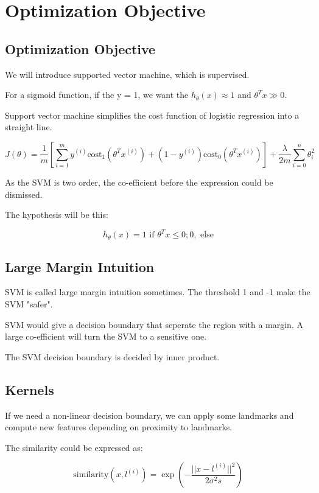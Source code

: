 \documentclass[en,11pt,english,black,simple]{../elegantbook}
\begin{document}
\fi 
\def\chapname{07optimibj}

\chapter{Optimization Objective}

\section{Optimization Objective}

We will introduce supported vector machine, which is supervised. 

For a sigmoid function, if the y = 1, we want the \(h_\theta(x)\approx 1\) and \(\theta^T x \gg 0\). 

Support vector machine simplifies the cost function of logistic regression into a straight line. 

\[J(\theta) = \frac{1}{m}\left[\sum_{i = 1}^{m} y^{(i)} \text{cost}_1 (\theta^T x^{(i)}) + (1 - y^{(i)}) \text{cost}_0 (\theta^T x^{(i)})\right] + \frac{\lambda}{2 m} \sum_{i = 0}^n \theta_i^2\]

As the SVM is two order, the co-efficient before the expression could be dismissed. 

The hypothesis will be this: 

\[h_\theta(x) = 1 \text{ if } \theta^T x \leq 0; 0, \text{ else}\]

\section{Large Margin Intuition}

SVM is called large margin intuition sometimes. The threshold 1 and -1 make the SVM "safer". 

SVM would give a decision boundary that seperate the region with a margin. A large co-efficient will turn the SVM to a sensitive one.

The SVM decision boundary is decided by inner product.

\section{Kernels}

If we need a non-linear decision boundary, we can apply some landmarks and compute new features depending on proximity to landmarks.

The similarity could be expressed as:

\[\text{similarity}(x, l^{(i)}) = \exp(-\frac{||x-l^{(i)}||^2}{2 \sigma^2s})\] 
\end{document}
